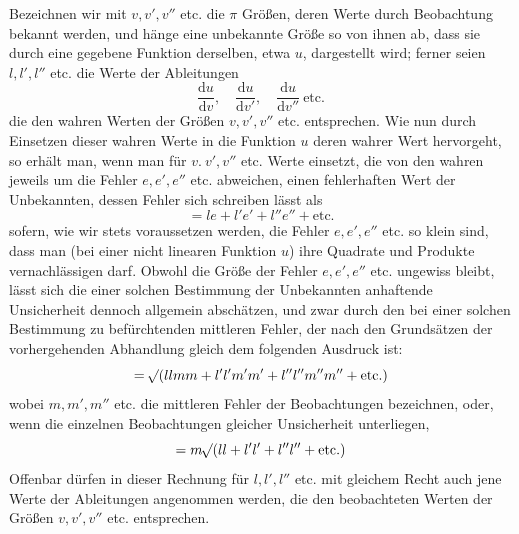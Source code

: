Bezeichnen wir mit \(v,v',v''\) etc. die \(\pi\) Größen, deren Werte durch Beobachtung bekannt werden, und hänge eine unbekannte Größe so von ihnen ab, dass sie durch eine gegebene Funktion derselben, etwa \(u\), dargestellt wird; ferner seien \(l,l',l''\) etc. die Werte der Ableitungen
\[
\frac{\mathrm du}{\mathrm dv},\quad \frac{\mathrm du}{\mathrm dv'},\quad \frac{\mathrm du}{\mathrm dv''}\ \text{etc.}
\]
die den wahren Werten der Größen \(v,v',v''\) etc. entsprechen. Wie nun durch Einsetzen dieser wahren Werte in die Funktion \(u\) deren wahrer Wert hervorgeht, so erhält man, wenn man für \(v.\ v',v''\) etc. Werte einsetzt, die von den wahren jeweils um die Fehler \(e,e',e''\) etc. abweichen, einen fehlerhaften Wert der Unbekannten, dessen Fehler sich schreiben lässt als
\[
=le+l'e'+l''e''+\text{etc.}
\]
sofern, wie wir stets voraussetzen werden, die Fehler \(e,e',e''\) etc. so klein sind, dass man (bei einer nicht linearen Funktion \(u\)) ihre Quadrate und Produkte vernachlässigen darf. Obwohl die Größe der Fehler \(e,e',e''\) etc. ungewiss bleibt, lässt sich die einer solchen Bestimmung der Unbekannten anhaftende Unsicherheit dennoch allgemein abschätzen, und zwar durch den bei einer solchen Bestimmung zu befürchtenden mittleren Fehler, der nach den Grundsätzen der vorhergehenden Abhandlung gleich dem folgenden Ausdruck ist:
\[
=\mathord{{}^{}\!\surd}(llmm+l'l'm'm'+l''l''m''m''+\text{etc.})
\]
%
wobei \(m,m',m''\) etc. die mittleren Fehler der Beobachtungen bezeichnen, oder, wenn die einzelnen Beobachtungen gleicher Unsicherheit unterliegen,
\[
=m\mathord{{}^{}\!\surd}(ll+l'l'+l''l''+\text{etc.})
\]
Offenbar dürfen in dieser Rechnung für \(l,l',l''\) etc. mit gleichem Recht auch jene Werte der Ableitungen angenommen werden, die den beobachteten Werten der Größen \(v,v',v''\) etc. entsprechen.

\clearpage
